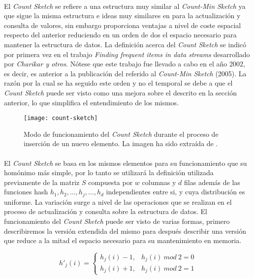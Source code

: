 \documentclass{subfiles}
\begin{document}
      \paragraph{}
      El \emph{Count Sketch} se refiere a una estructura muy similar al \emph{Count-Min Sketch} ya que sigue la misma estructura e ideas muy similares en para la actualización y consulta de valores, sin embargo proporciona ventajas a nivel de coste espacial respecto del anterior reduciendo en un orden de dos el espacio necesario para mantener la estructura de datos. La definición acerca del \emph{Count Sketch} se indicó por primera vez en el trabajo \emph{Finding frequent items in data streams} \cite{charikar2002finding} desarrollado por \emph{Charikar y otros}. Nótese que este trabajo fue llevado a cabo en el año 2002, es decir, es anterior a la publicación del referido al \emph{Count-Min Sketch} (2005). La razón por la cual se ha seguido este orden y no el temporal se debe a que el \emph{Count Sketch} puede ser visto como una mejora sobre el descrito en la sección anterior, lo que simplifica el entendimiento de los mismos.

      \begin{figure}
        \centering
        \texttt{[image: count-sketch]}
        \caption{Modo de funcionamiento del \emph{Count Sketch} durante el proceso de inserción de un nuevo elemento. La imagen ha sido extraída de \cite{cormode2012synopses}.}
        \label{fig:count_sketch}
      \end{figure}

      \paragraph{}
      El \emph{Count Sketch} se basa en los mismos elementos para su funcionamiento que su homónimo más simple, por lo tanto se utilizará la definición utilizada previamente de la matriz $S$ compuesta por $w$ columnas y $d$ filas además de las funciones hash $h_1, h_2, ..., h_j,..., h_d$ independientes entre si, y cuya distribución es uniforme. La variación surge a nivel de las operaciones que se realizan en el proceso de actualización y consulta sobre la estructura de datos. El funcionamiento del \emph{Count Sketch} puede ser visto de varias formas, primero describiremos la versión extendida del mismo para después describir una versión que reduce a la mitad el espacio necesario para su mantenimiento en memoria.

      \begin{equation}
      \label{eq:count_sketch_hash_2}
        h'_j(i) =
          \begin{cases}
            h_j(i) - 1, & h_j(i) \ mod \ 2 = 0\\
            h_j(i) + 1, & h_j(i) \ mod \ 2 = 1
          \end{cases}
      \end{equation}
\end{document}
